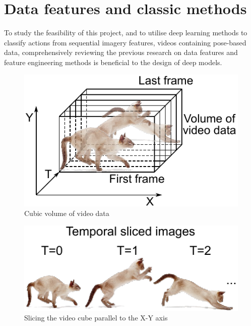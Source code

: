 \section{Data features and classic methods}
\label{sec:Data features and classic methods}
To study the feasibility of this project, and to utilise deep learning methods to classify actions from sequential imagery features, videos containing pose-based data, comprehensively reviewing the previous research on data features and feature engineering methods is beneficial to the design of deep models.

\begin{minipage}[ht]{.48\textwidth}
    \begin{figure}[H]
        \centering
        \includegraphics{literature/imgs/1-video-volume.pdf}
        \caption{Cubic volume of video data}
        \label{fig:1-video-volume}
    \end{figure}
\end{minipage}
\begin{minipage}[ht]{.5\textwidth}
    \begin{figure}[H]
        \centering
        \includegraphics{literature/imgs/2-video-slice.pdf}
        \caption{Slicing the video cube parallel to the X-Y axis}
        \label{fig:2-video-slice}
    \end{figure}
\end{minipage}

